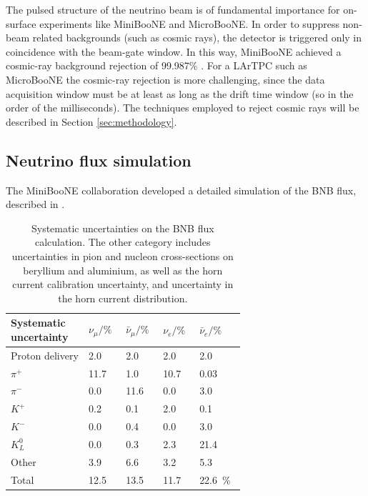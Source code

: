The pulsed structure of the neutrino beam is of fundamental importance for on-surface experiments like MiniBooNE and MicroBooNE. In order to suppress non-beam related backgrounds (such as cosmic rays), the detector is triggered only in coincidence with the beam-gate window. In this way, MiniBooNE achieved a cosmic-ray background rejection of 99.987\% \cite{AguilarArevalo:2008qa}. For a LArTPC such as MicroBooNE the cosmic-ray rejection is more challenging, since the data acquisition window must be at least as long as the drift time window (so in the order of the milliseconds). The techniques employed to reject cosmic rays will be described in Section \ref{sec:methodology}.
 
\subsection{Neutrino flux simulation}\label{sec:flux}
The MiniBooNE collaboration developed a detailed simulation of the BNB flux, described in \cite{AguilarArevalo:2008yp}. 

\begin{table}[htbp]
   \centering
     \caption{Systematic uncertainties on the BNB flux calculation. The other category includes uncertainties in pion and nucleon cross-sections on beryllium and aluminium, as well as the horn current calibration uncertainty, and uncertainty in the horn current distribution.}
   \begin{tabular}{p{0.25\linewidth}p{0.1\linewidth}p{0.1\linewidth}p{0.1\linewidth}p{0.1\linewidth}}
     \toprule
     Systematic uncertainty & $\nu_{\mu}/\%$ & $\bar{\nu}_{\mu}/\%$ & $\nu_e/\%$ & $\bar{\nu}_e/\%$ \\
     \midrule
     Proton delivery & 2.0 & 2.0 & 2.0 & 2.0 \\
     $\pi^+$ & 11.7 & 1.0 & 10.7 & 0.03 \\ 
     $\pi^-$ & 0.0 & 11.6 & 0.0 & 3.0 \\
     $K^+$ & 0.2 & 0.1 & 2.0 & 0.1 \\
     $K^-$ & 0.0 & 0.4 & 0.0 & 3.0 \\
     $K^0_L$ & 0.0 & 0.3 & 2.3 & 21.4 \\
     Other & 3.9 & 6.6 & 3.2 & 5.3 \\
     \midrule
     Total & 12.5 & 13.5 & 11.7 & 22.6~\%\\
     \bottomrule
   \end{tabular}
\label{tab:flux_syst}
\end{table}

